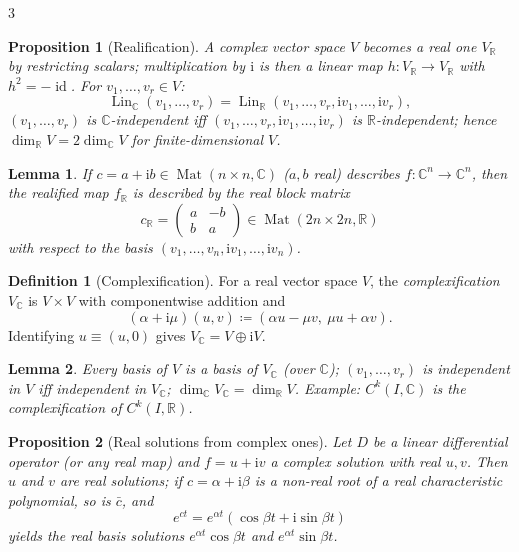 \documentclass[10pt,a4paper,landscape]{article}
\theoremstyle{definition}
\newtheorem{defn}{Definition}[section]
\theoremstyle{plain}
\newtheorem{lem}{Lemma}[section]
\newtheorem{prop}{Proposition}[section]
\theoremstyle{remark}
\newcommand{\R}{\mathbb{R}}
\newcommand{\C}{\mathbb{C}}
\newcommand{\id}{\operatorname{id}}
\newcommand{\deq}{\coloneqq}
\DeclareMathOperator{\Lin}{Lin}
\DeclareMathOperator{\Mat}{Mat}
\newcommand{\dsum}{\oplus}
\begin{document}
\begin{multicols*}{3}
\begin{prop}[Realification]
A complex vector space $V$ becomes a real one $V_{\R}$ by restricting scalars; multiplication by $\mathrm{i}$ is then a \emph{linear map} $h: V_{\R} \to V_{\R}$ with $h^2 = -\id$. For $v_1, \dots, v_r \in V$:
\[
\Lin_{\C}(v_1, \dots, v_r) = \Lin_{\R}(v_1, \dots, v_r, \mathrm{i}v_1, \dots, \mathrm{i}v_r),
\]
$(v_1,\dots,v_r)$ is $\C$-independent iff $(v_1, \dots, v_r, \mathrm{i}v_1, \dots, \mathrm{i}v_r)$ is $\R$-independent; hence $\dim_{\R} V = 2 \dim_{\C} V$ for finite-dimensional $V$.
\end{prop}

\begin{lem}
If $c = a + \mathrm{i}b \in \Mat(n \times n, \C)$ ($a, b$ real) describes $f: \C^n \to \C^n$, then the realified map $f_{\R}$ is described by the real block matrix
\[
c_{\R} = \begin{pmatrix} a & -b \\ b & a \end{pmatrix} \in \Mat(2n \times 2n, \R)
\]
with respect to the basis $(v_1, \dots, v_n, \mathrm{i}v_1, \dots, \mathrm{i}v_n)$.
\end{lem}

\begin{defn}[Complexification]
For a real vector space $V$, the \emph{complexification} $V_{\C}$ is $V \times V$ with componentwise addition and
\[
(\alpha + \mathrm{i}\mu)(u, v) \deq (\alpha u - \mu v,\ \mu u + \alpha v).
\]
Identifying $u \equiv (u, 0)$ gives $V_{\C} = V \dsum \mathrm{i}V$.
\end{defn}

\begin{lem}
Every basis of $V$ is a basis of $V_{\C}$ (over $\C$); $(v_1, \dots, v_r)$ is independent in $V$ iff independent in $V_{\C}$; $\dim_{\C} V_{\C} = \dim_{\R} V$. Example: $C^k(I, \C)$ is the complexification of $C^k(I, \R)$.
\end{lem}

\begin{prop}[Real solutions from complex ones]
Let $D$ be a linear differential operator (or any real map) and $f = u + \mathrm{i}v$ a complex solution with real $u, v$. Then $u$ and $v$ are real solutions; if $c = \alpha + \mathrm{i}\beta$ is a non-real root of a real characteristic polynomial, so is $\bar c$, and
\[
e^{ct} = e^{\alpha t}(\cos \beta t + \mathrm{i} \sin \beta t)
\]
yields the real basis solutions $e^{\alpha t}\cos \beta t$ and $e^{\alpha t}\sin \beta t$.
\end{prop}


\end{multicols*}
\end{document}
